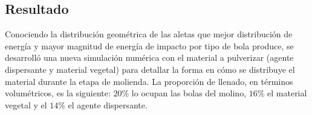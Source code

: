 \newpage

\begin{center}
	\section{Resultado}
\end{center}

\noindent
\justify

Conociendo la distribuci\'on geom\'etrica de las aletas que mejor distribuci\'on de energ\'ia y mayor magnitud de energ\'ia de impacto por tipo de bola produce, se desarroll\'o una nueva simulaci\'on num\'erica con el material a pulverizar (agente dispersante y material vegetal) para detallar la forma en c\'omo se distribuye el material durante la etapa de molienda. La proporci\'on de llenado, en t\'erminos volum\'etricos, es la siguiente: $20\%$ lo ocupan las bolas del molino, $16\%$ el material vegetal y el $14\%$ el agente dispersante.

